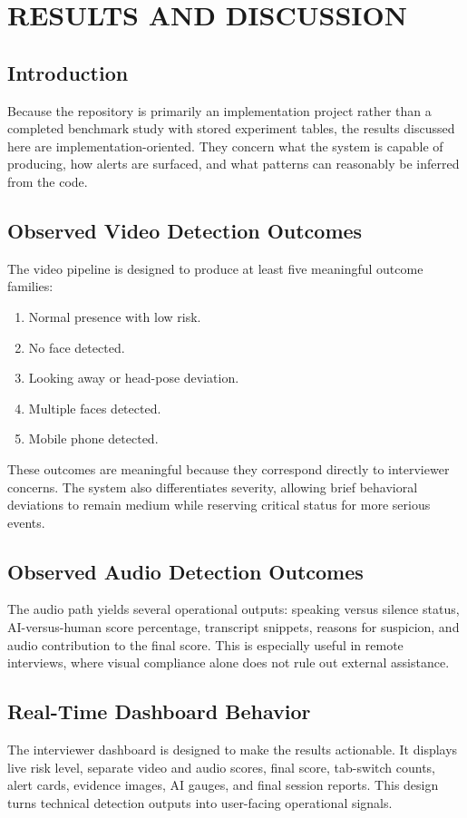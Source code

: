 \documentclass[12pt,a4paper]{extreport}
\begin{document}
\chapter{RESULTS AND DISCUSSION}
\section{Introduction}
Because the repository is primarily an implementation project rather than a completed benchmark study with stored experiment tables, the results discussed here are implementation-oriented. They concern what the system is capable of producing, how alerts are surfaced, and what patterns can reasonably be inferred from the code.

\section{Observed Video Detection Outcomes}
The video pipeline is designed to produce at least five meaningful outcome families:
\begin{enumerate}
  \item Normal presence with low risk.
  \item No face detected.
  \item Looking away or head-pose deviation.
  \item Multiple faces detected.
  \item Mobile phone detected.
\end{enumerate}

These outcomes are meaningful because they correspond directly to interviewer concerns. The system also differentiates severity, allowing brief behavioral deviations to remain medium while reserving critical status for more serious events.

\section{Observed Audio Detection Outcomes}
The audio path yields several operational outputs: speaking versus silence status, AI-versus-human score percentage, transcript snippets, reasons for suspicion, and audio contribution to the final score. This is especially useful in remote interviews, where visual compliance alone does not rule out external assistance.

\section{Real-Time Dashboard Behavior}
The interviewer dashboard is designed to make the results actionable. It displays live risk level, separate video and audio scores, final score, tab-switch counts, alert cards, evidence images, AI gauges, and final session reports. This design turns technical detection outputs into user-facing operational signals.
\end{document}
